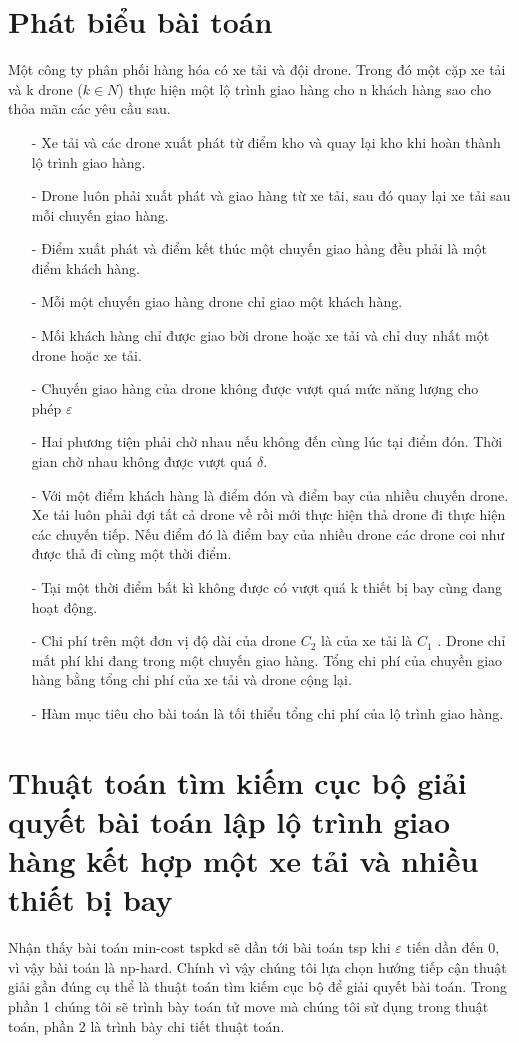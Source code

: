 \documentclass[a4paper,12pt]{report}
\begin{document}
\section{Phát biểu bài toán}
\label{section:pbtspkd}
Một công ty phân phối hàng hóa có xe tải và đội drone. Trong đó một cặp xe tải và k drone ($k \in N$) thực hiện một lộ trình giao hàng cho n khách hàng sao cho thỏa mãn các yêu cầu sau.
\begin{itemize}
\item[-] Xe tải và các drone xuất phát từ điểm kho và quay lại kho khi hoàn thành lộ trình giao hàng.
\item[-] Drone luôn phải xuất phát và giao hàng từ xe tải, sau đó quay lại xe tải sau mỗi chuyến giao hàng.
\item[-] Điểm xuất phát và điểm kết thúc một chuyến giao hàng đều phải là một điểm khách hàng.
\item[-] Mỗi một chuyến giao hàng drone chỉ giao một khách hàng.
\item[-] Mối khách hàng chỉ được giao bời drone hoặc xe tải và chỉ duy nhất một drone hoặc xe tải.
\item[-] Chuyến giao hàng của drone không được vượt quá mức năng lượng cho phép $\varepsilon$ 
\item[-] Hai phương tiện phải chờ nhau nếu không đến cùng lúc tại điểm đón. Thời gian chờ nhau không được vượt quá $\delta$.
\item[-] Với một điểm khách hàng là điểm đón và điểm bay của nhiều chuyến drone. Xe tải luôn phải đợi tất cả drone về rồi mới thực hiện thả drone đi thực hiện các chuyến tiếp. Nếu điểm đó là điểm bay của nhiều drone các drone coi như được thả đi cùng một thời điểm.
\item[-] Tại một thời điểm bất kì không được có vượt quá k thiết bị bay cùng đang hoạt động.
\item[-] Chi phí trên một đơn vị độ dài của drone $C_2$ là của xe tải là $C_1$ . Drone chỉ mất phí khi đang trong một chuyến giao hàng. Tổng chi phí của chuyền giao hàng bằng tổng chi phí của xe tải và drone cộng lại.
\item[-] Hàm mục tiêu cho bài toán là tối thiểu tổng chi phí của lộ trình giao hàng.
\end{itemize}
\section{Thuật toán tìm kiếm cục bộ giải quyết bài toán lập lộ trình giao hàng kết hợp một xe tải và nhiều thiết bị bay} 
\label{section:tspkdalo}
Nhận thấy bài toán min-cost tspkd sẽ dần tới bài toán tsp khi $\varepsilon$ tiến dần đến 0, vì vậy bài toán là np-hard. Chính vì vậy chúng tôi lựa chọn hướng tiếp cận thuật giải gần đúng cụ thể là thuật toán tìm kiếm cục bộ để giải quyết bài toán. Trong phần 1 chúng tôi sẽ trình bày toán tử move mà chúng tôi sử dụng trong thuật toán, phần 2 là trình bày chi tiết thuật toán.
\end{document}
